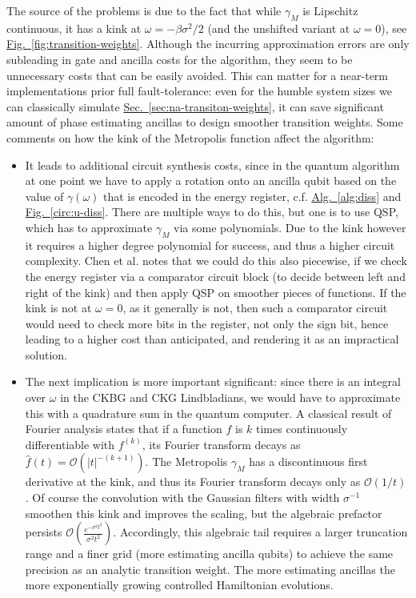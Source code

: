 The source of the problems is due to the fact that while $\gamma_M$ is Lipschitz continuous, it has a kink at $\omega = -\beta\sigma^2 / 2$ (and the unshifted variant at $\omega = 0$), see \hyperref[fig:transition-weights]{Fig.~\ref*{fig:transition-weights}}. Although the incurring approximation errors are only subleading in gate and ancilla costs for the algorithm, they seem to be unnecessary costs that can be easily avoided. This can matter for a near-term implementations prior full fault-tolerance: even for the humble system sizes we can classically simulate \hyperref[sec:na-transiton-weights]{Sec.~\ref*{sec:na-transiton-weights}}, it can save significant amount of phase estimating ancillas to design smoother transition weights. Some comments on how the kink of the Metropolis function affect the algorithm:

\begin{itemize}
    \item It leads to additional circuit synthesis costs, since in the quantum algorithm at one point we have to apply a rotation onto an ancilla qubit based on the value of $\gamma(\omega)$ that is encoded in the energy register, c.f. \hyperref[alg:diss]{Alg.~\ref*{alg:diss}} and \hyperref[circ:u-diss]{Fig.~\ref*{circ:u-diss}}. There are multiple ways to do this, but one is to use QSP, which has to approximate $\gamma_M$ via some polynomials. Due to the kink however it requires a higher degree polynomial for success, and thus a higher circuit complexity. Chen et al. notes \cite[footnote 33.]{chen2023quantum} that we could do this also piecewise, if we check the energy register via a comparator circuit block (to decide between left and right of the kink) and then apply QSP on smoother pieces of functions. If the kink is not at $\omega = 0$, as it generally is not, then such a comparator circuit would need to check more bits in the register, not only the sign bit, hence leading to a higher cost than anticipated, and rendering it as an impractical solution.
    \item The next implication is more important significant: since there is an integral over $\omega$ in the CKBG and CKG Lindbladians, we would have to approximate this with a quadrature sum in the quantum computer. A classical result of Fourier analysis \cite[Chapter 2.]{stein2011fourier} states that if a function $f$ is $k$ times continuously differentiable with $f^{(k)}$, its Fourier transform decays as $\hat{f}(t) = \mathcal{O}(|t|^{-(k+1)})$. The Metropolis $\gamma_M$ has a discontinuous first derivative at the kink, and thus its Fourier transform decays only as $\mathcal{O}(1 / t)$. Of course the convolution with the Gaussian filters with width $ \sigma^{-1}$ smoothen this kink and improves the scaling, but the algebraic prefactor persists $\mathcal{O}(\frac{e^{-\sigma^2 t^2}}{\sigma^2 t^2})$. Accordingly, this algebraic tail requires a larger truncation range and a finer grid (more estimating ancilla qubits) to achieve the same precision as an analytic transition weight. The more estimating ancillas the more exponentially growing controlled Hamiltonian evolutions.

\end{itemize}
